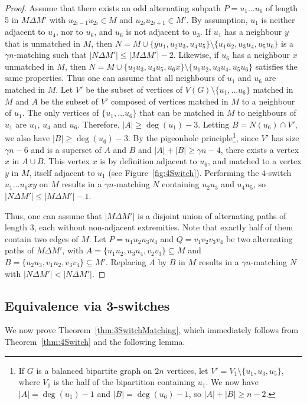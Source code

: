 \documentclass[11pt,a4paper]{article}
\theoremstyle{definition}
\begin{document}
\begin{proof}
  Assume that there exists an odd alternating subpath $P=u_1 \dots u_{6}$ of
  length 5 in $M \Delta M'$ with $u_{2i-1}u_{2i} \in M$ and
  $u_{2i}u_{2i+1} \in M'$. By assumption, $u_1$ is neither adjacent to $u_4$,
  nor to $u_6$, and $u_6$ is not adjacent to $u_3$. If $u_1$ has a neighbour $y$
  that is unmatched in $M$, then
  $N = M \cup \{yu_1,u_2u_3, u_4u_5\} \setminus \{u_1u_2,u_3u_4,u_5u_6\}$ is
  a $\gamma n$-matching such that $|N \Delta M'| \le |M \Delta M'|-2$. Likewise,
  if $u_6$ has a neighbour $x$ unmatched in $M$, then
  $N = M \cup \{u_2u_3, u_4u_5, u_6x\} \setminus \{u_1u_2,u_3u_4,u_5u_6\}$
  satisfies the same properties. Thus one can assume that all neighbours of
  $u_1$ and $u_6$ are matched in $M$. Let $V'$ be the subset of vertices of
  $V(G) \setminus \{u_1, \dots u_6\}$ matched in $M$ and $A$ be the subset of
  $V'$ composed of vertices matched in $M$ to a neighbour of $u_1$. The only
  vertices of $\{u_1, \dots u_6\}$ that can be matched in $M$ to neighbours of
  $u_1$ are $u_1$, $u_4$ and $u_6$. Therefore, $|A| \ge \deg(u_1)-3$. Letting
  $B = N(u_6) \cap V'$, we also have $|B| \ge \deg(u_6) -3$. By the pigeonhole
  principle\footnote{If $G$ is a balanced bipartite graph on $2n$ vertices, let
    $V' = V_1 \setminus \{u_1, u_3, u_5\}$, where $V_1$ is the half of the
    bipartition containing $u_1$. We now have $|A| = \deg (u_1) -1$ and
    $|B| = \deg(u_6) -1$, so $|A| + |B| \ge n-2$.}, since $V'$ has size
  $\gamma n -6$ and is a superset of $A$ and $B$ and
  $|A| + |B| \ge \gamma n -4$, there exists a vertex $x$ in $A\cup B$. This
  vertex $x$ is by definition adjacent to $u_6$, and matched to a vertex $y$ in
  $M$, itself adjacent to $u_1$ (see Figure~\ref{fig:4Switch}). Performing the
  $4$-switch $u_1 \dots u_6xy$ on $M$ results in a $\gamma n$-matching $N$
  containing $u_2u_3$ and $u_4u_5$, so $|N \Delta M'| \le |M\Delta M'| - 1$.

  Thus, one can assume that $|M\Delta M'|$ is a disjoint union of alternating
  paths of length 3, each without non-adjacent extremities. Note that exactly
  half of them contain two edges of $M$. Let $P=u_1u_2u_3u_4$ and
  $Q=v_1v_2v_3v_4$ be two alternating paths of $M\Delta M'$, with
  $A=\{u_1u_2, u_3u_4,v_2v_3\} \subseteq M$ and
  $B=\{u_2u_3, v_1u_2,v_3v_4\} \subseteq M'$. Replacing $A$ by $B$ in $M$
  results in a $\gamma n$-matching $N$ with
  $|N\Delta M'| < |N\Delta M'|$.
\end{proof}

  
\subsection{Equivalence via 3-switches}\label{ssec:3switch}
We now prove Theorem~\ref{thm:3SwitchMatching}, which immediately follows from
Theorem~\ref{thm:4Switch} and the following lemma.
\end{document}
